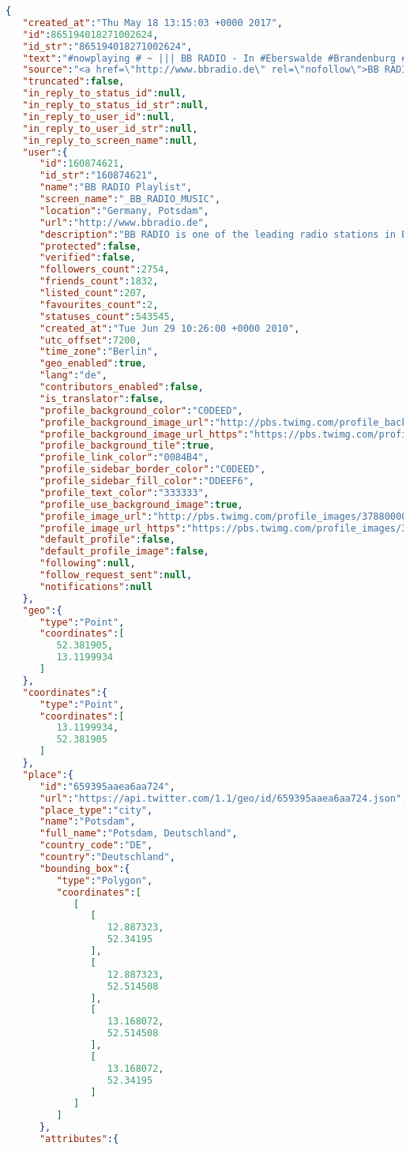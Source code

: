 \begin{lstlisting}[language=json,firstnumber=1]
{  
   "created_at":"Thu May 18 13:15:03 +0000 2017",
   "id":865194018271002624,
   "id_str":"865194018271002624",
   "text":"#nowplaying # ~ ||| BB RADIO - In #Eberswalde #Brandenburg #GER auf 95.4",
   "source":"<a href=\"http://www.bbradio.de\" rel=\"nofollow\">BB RADIO Music App</a>",
   "truncated":false,
   "in_reply_to_status_id":null,
   "in_reply_to_status_id_str":null,
   "in_reply_to_user_id":null,
   "in_reply_to_user_id_str":null,
   "in_reply_to_screen_name":null,
   "user":{  
      "id":160874621,
      "id_str":"160874621",
      "name":"BB RADIO Playlist",
      "screen_name":"_BB_RADIO_MUSIC",
      "location":"Germany, Potsdam",
      "url":"http://www.bbradio.de",
      "description":"BB RADIO is one of the leading radio stations in Berlin and Brandenburg in Germany.",
      "protected":false,
      "verified":false,
      "followers_count":2754,
      "friends_count":1832,
      "listed_count":207,
      "favourites_count":2,
      "statuses_count":543545,
      "created_at":"Tue Jun 29 10:26:00 +0000 2010",
      "utc_offset":7200,
      "time_zone":"Berlin",
      "geo_enabled":true,
      "lang":"de",
      "contributors_enabled":false,
      "is_translator":false,
      "profile_background_color":"C0DEED",
      "profile_background_image_url":"http://pbs.twimg.com/profile_background_images/118093501/bbradio_s.jpg",
      "profile_background_image_url_https":"https://pbs.twimg.com/profile_background_images/118093501/bbradio_s.jpg",
      "profile_background_tile":true,
      "profile_link_color":"0084B4",
      "profile_sidebar_border_color":"C0DEED",
      "profile_sidebar_fill_color":"DDEEF6",
      "profile_text_color":"333333",
      "profile_use_background_image":true,
      "profile_image_url":"http://pbs.twimg.com/profile_images/378800000836922769/91a442228e84cae19e4e88e0ce735362_normal.jpeg",
      "profile_image_url_https":"https://pbs.twimg.com/profile_images/378800000836922769/91a442228e84cae19e4e88e0ce735362_normal.jpeg",
      "default_profile":false,
      "default_profile_image":false,
      "following":null,
      "follow_request_sent":null,
      "notifications":null
   },
   "geo":{  
      "type":"Point",
      "coordinates":[  
         52.381905,
         13.1199934
      ]
   },
   "coordinates":{  
      "type":"Point",
      "coordinates":[  
         13.1199934,
         52.381905
      ]
   },
   "place":{  
      "id":"659395aaea6aa724",
      "url":"https://api.twitter.com/1.1/geo/id/659395aaea6aa724.json",
      "place_type":"city",
      "name":"Potsdam",
      "full_name":"Potsdam, Deutschland",
      "country_code":"DE",
      "country":"Deutschland",
      "bounding_box":{  
         "type":"Polygon",
         "coordinates":[  
            [  
               [  
                  12.887323,
                  52.34195
               ],
               [  
                  12.887323,
                  52.514508
               ],
               [  
                  13.168072,
                  52.514508
               ],
               [  
                  13.168072,
                  52.34195
               ]
            ]
         ]
      },
      "attributes":{  


\end{lstlisting}

